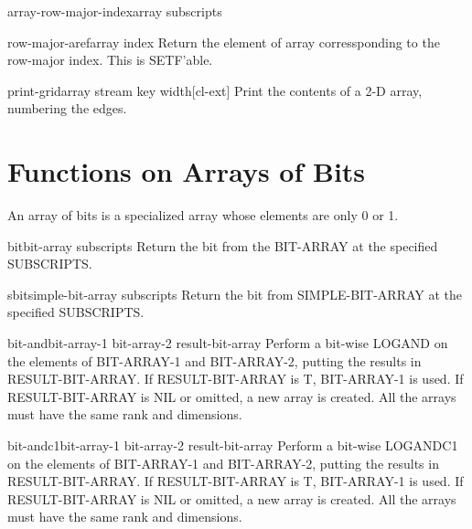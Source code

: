 \documentclass[10pt,english]{book}
\begin{document}
\begin{function}{array-row-major-index}{array \rest subscripts}
  
\end{function}

\begin{accessor}{row-major-aref}{array index}
  Return the element of array corressponding to the row-major index. This is
   SETF'able.
\end{accessor}

\begin{function}{print-grid}{array \key stream key width}[cl-ext]
  Print the contents of a 2-D array, numbering the edges.
\end{function}

\section{Functions on Arrays of Bits}
\label{sec:funct-arrays-bits}

An array of bits is a specialized array whose elements are only 0 or
1.

\begin{accessor}{bit}{bit-array \rest subscripts}
  Return the bit from the BIT-ARRAY at the specified SUBSCRIPTS.
\end{accessor}

\begin{accessor}{sbit}{simple-bit-array \rest subscripts}
  Return the bit from SIMPLE-BIT-ARRAY at the specified SUBSCRIPTS.
\end{accessor}

\begin{function}{bit-and}{bit-array-1 bit-array-2 \op result-bit-array}
  Perform a bit-wise LOGAND on the elements of BIT-ARRAY-1 and BIT-ARRAY-2,
  putting the results in RESULT-BIT-ARRAY. If RESULT-BIT-ARRAY is T,
  BIT-ARRAY-1 is used. If RESULT-BIT-ARRAY is NIL or omitted, a new array is
  created. All the arrays must have the same rank and dimensions.
\end{function}

\begin{function}{bit-andc1}{bit-array-1 bit-array-2 \op result-bit-array}
  Perform a bit-wise LOGANDC1 on the elements of BIT-ARRAY-1 and BIT-ARRAY-2,
  putting the results in RESULT-BIT-ARRAY. If RESULT-BIT-ARRAY is T,
  BIT-ARRAY-1 is used. If RESULT-BIT-ARRAY is NIL or omitted, a new array is
  created. All the arrays must have the same rank and dimensions.
\end{function}
\end{document}
